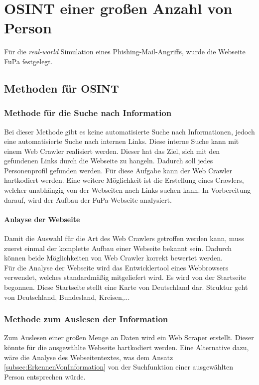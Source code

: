 
\chapter{OSINT einer großen Anzahl von Person}  %
\label{cha:Informationsbeschaffung einer grossen Anzahl von Person} %
Für die \textit{real-world} Simulation eines Phishing-Mail-Angriffs, wurde die Webseite FuPa festgelegt.

\section{Methoden für OSINT}
	\subsection{Methode für die Suche nach Information}
	Bei dieser Methode gibt es keine automatisierte Suche nach Informationen, jedoch eine automatisierte Suche nach internen Links. Diese interne Suche kann mit einem Web Crawler realisiert werden. Dieser hat das Ziel, sich mit den gefundenen Links durch die Webseite zu hangeln. Dadurch soll jedes Personenprofil gefunden werden. Für diese Aufgabe kann der Web Crawler hartkodiert werden. Eine weitere Möglichkeit ist die Erstellung eines Crawlers, welcher unabhängig von der Webseiten nach Links suchen kann. In Vorbereitung darauf, wird der Aufbau der FuPa-Webseite analysiert.\\
		\subsubsection{Anlayse der Webseite}
		Damit die Auswahl für die Art des Web Crawlers getroffen werden kann, muss zuerst einmal der komplette Aufbau einer Webseite bekannt sein. Dadurch können beide Möglichkeiten von Web Crawler korrekt bewertet werden.\\
		Für die Analyse der Webseite wird das Entwicklertool eines Webbrowsers verwendet, welches standardmäßig mitgeliefert wird. %
		Es wird von der Startseite begonnen. Diese Startseite stellt eine Karte von Deutschland dar. Struktur geht von Deutschland, Bundesland, Kreisen,...
	\subsection{Methode zum Auslesen der Information}
	Zum Auslesen einer großen Menge an Daten wird ein Web Scraper erstellt. Dieser könnte für die ausgewählte Webseite hartkodiert werden. Eine Alternative dazu, wäre die Analyse des Webseitentextes, was dem Ansatz \ref{subsec:ErkennenVonInformation} von der Suchfunktion einer ausgewählten Person entsprechen würde.


